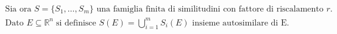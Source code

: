 \documentclass[preview]{standalone}
\begin{document}
\begin{align*}
\text{Sia ora }S = \{S_1, \dots, S_m\} \text{ una famiglia finita di similitudini con fattore di riscalamento } r.\\ \text{Dato } E \subseteq \mathbb{R}^n \;\text{si definisce } S(E) = \bigcup_{i=1}^m S_i(E) \text{ insieme autosimilare di E.}
\end{align*}
\end{document}
